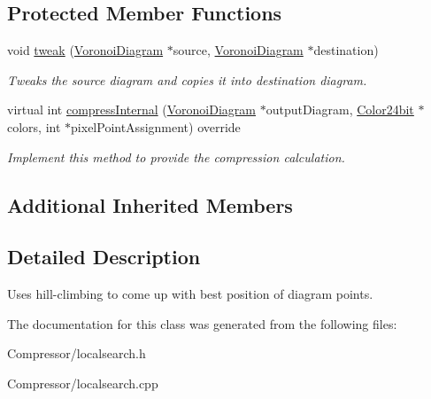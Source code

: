 \subsection*{Protected Member Functions}
\begin{DoxyCompactItemize}
\item 
void \hyperlink{classlossycompressor_1_1_local_search_a3531b177402f98c172e412333310ec58}{tweak} (\hyperlink{structlossycompressor_1_1_voronoi_diagram}{Voronoi\+Diagram} $\ast$source, \hyperlink{structlossycompressor_1_1_voronoi_diagram}{Voronoi\+Diagram} $\ast$destination)\hypertarget{classlossycompressor_1_1_local_search_a3531b177402f98c172e412333310ec58}{}\label{classlossycompressor_1_1_local_search_a3531b177402f98c172e412333310ec58}

\begin{DoxyCompactList}\small\item\em Tweaks the source diagram and copies it into destination diagram. \end{DoxyCompactList}\item 
virtual int \hyperlink{classlossycompressor_1_1_local_search_a23f2fb30df43d1166c1a2340e79cda06}{compress\+Internal} (\hyperlink{structlossycompressor_1_1_voronoi_diagram}{Voronoi\+Diagram} $\ast$output\+Diagram, \hyperlink{structlossycompressor_1_1_color24bit}{Color24bit} $\ast$colors, int $\ast$pixel\+Point\+Assignment) override\hypertarget{classlossycompressor_1_1_local_search_a23f2fb30df43d1166c1a2340e79cda06}{}\label{classlossycompressor_1_1_local_search_a23f2fb30df43d1166c1a2340e79cda06}

\begin{DoxyCompactList}\small\item\em Implement this method to provide the compression calculation. \end{DoxyCompactList}\end{DoxyCompactItemize}
\subsection*{Additional Inherited Members}


\subsection{Detailed Description}
Uses hill-\/climbing to come up with best position of diagram points. 

The documentation for this class was generated from the following files\+:\begin{DoxyCompactItemize}
\item 
Compressor/localsearch.\+h\item 
Compressor/localsearch.\+cpp\end{DoxyCompactItemize}

